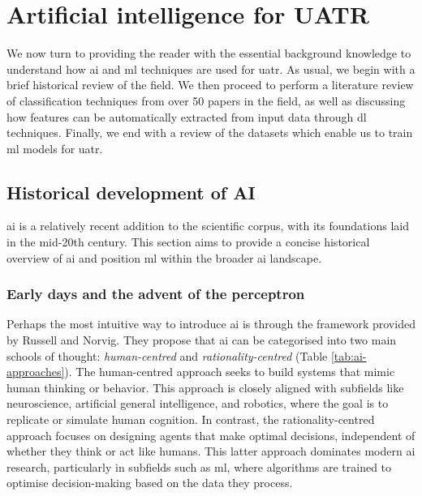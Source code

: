 \section{Artificial intelligence for UATR}

We now turn to providing the reader with the essential background knowledge to understand how \acrlong{ai} and \acrlong{ml} techniques are used for \acrshort{uatr}. As usual, we begin with a brief historical review of the field. We then proceed to perform a literature review of classification techniques from over 50 papers in the field, as well as discussing how features can be automatically extracted from input data through \acrlong{dl} techniques. Finally, we end with a review of the datasets which enable us to train \acrshort{ml} models for \acrshort{uatr}.

\subsection{Historical development of AI}\label{subsec:ai-history}

\Acrlong{ai} is a relatively recent addition to the scientific corpus, with its foundations laid in the mid-20th century. This section aims to provide a concise historical overview of \acrshort{ai} and position \acrlong{ml} within the broader \acrshort{ai} landscape\footnotemark.


\subsubsection{Early days and the advent of the perceptron}

Perhaps the most intuitive way to introduce \acrlong{ai} is through the framework provided by Russell and Norvig. They propose that \acrlong{ai} can be categorised into two main schools of thought: \textit{human-centred} and \textit{rationality-centred} (Table \ref{tab:ai-approaches}). The human-centred approach seeks to build systems that mimic human thinking or behavior. This approach is closely aligned with subfields like neuroscience, artificial general intelligence, and robotics, where the goal is to replicate or simulate human cognition. In contrast, the rationality-centred approach focuses on designing agents that make optimal decisions, independent of whether they think or act like humans. This latter approach dominates modern \acrshort{ai} research, particularly in subfields such as \acrlong{ml}, where algorithms are trained to optimise decision-making based on the data they process. 

